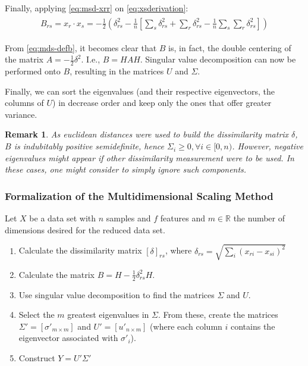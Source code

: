 \documentclass[12pt]{article}
\newtheorem{remark}{Remark}[section]
\begin{document}
Finally, applying \ref{eq:msd-xrr} on \ref{eq:xsderivation}:
\begin{align}
\label{eq:mds-defb}
\begin{split}
B_{rs} = x_r\cdot x_s = -\frac{1}{2} (\delta_{rs}^2 - \frac{1}{n} [\sum_s \delta_{rs}^2 + \sum_r \delta_{rs}^2 - \frac{1}{n}\sum_s \sum_r \delta_{rs}^2])
\end{split}
\end{align}

From \ref{eq:mds-defb}, it becomes clear that $B$ is, in fact, the double centering of the matrix $A=-\frac{1}{2}\delta^2$. I.e., $B=HAH$. Singular value decomposition can now be performed onto $B$, resulting in the matrices $U$ and $\Sigma$.

Finally, we can sort the eigenvalues (and their respective eigenvectors, the columns of $U$) in decrease order and keep only the ones that offer greater variance.

\begin{remark}
	As euclidean distances were used to build the dissimilarity matrix $\delta$, $B$ is indubitably positive semidefinite, hence $\Sigma_i \ge 0, \forall i\in [0, n)$. However, negative eigenvalues might appear if other dissimilarity measurement were to be used. In these cases, one might consider to simply ignore such components.
\end{remark}

\subsubsection{Formalization of the Multidimensional Scaling Method}

Let $X$ be a data set with $n$ samples and $f$ features and $m\in\mathbb{R}$ the number of dimensions desired for the reduced data set. \cite{cox2001}

\begin{enumerate}
	\item Calculate the dissimilarity matrix $[\delta]_{rs}$, where $\delta_{rs} = \sqrt{\sum_i (x_{ri} - x_{si})^2}$
	\item Calculate the matrix $B=H-\frac{1}{2}\delta_{rs}^2H$.

	\item Use singular value decomposition to find the matrices $\Sigma$ and $U$.

	\item Select the $m$ greatest eigenvalues in $\Sigma$. From these, create the matrices $\Sigma'=[\sigma'_{m\times m}]$ and $U'=[u'_{n\times m}]$ (where each column $i$ contains the eigenvector associated with $\sigma'_i$).

	\item Construct $Y=U'\Sigma'$
\end{enumerate}
\end{document}
